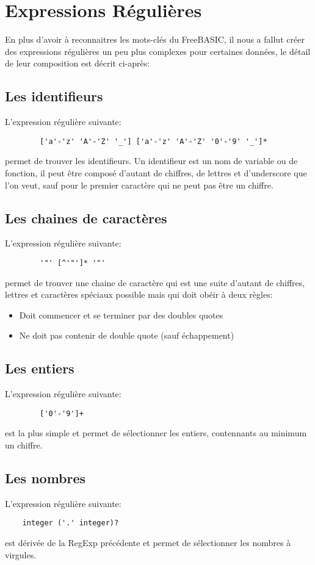 \section{Expressions Régulières}


En plus d'avoir à reconnaitres les mots-clés du FreeBASIC, il nous a fallut créer des expressions régulières un peu plus complexes pour certaines données, le détail de leur composition est décrit ci-après:

\subsection{Les identifieurs} 
    L'expression régulière suivante:
    \begin{verbatim}
        ['a'-'z' 'A'-'Z' '_'] ['a'-'z' 'A'-'Z' '0'-'9' '_']*
    \end{verbatim}
    permet de trouver les identifieurs. Un identifieur est un nom de variable ou de fonction, il peut être composé d'autant de chiffres, de lettres et d'underscore que l'on veut, sauf pour le premier caractère qui ne peut pas être un chiffre.
    
\subsection{Les chaines de caractères}
    L'expression régulière suivante:
    \begin{verbatim}
        '"' [^'"']* '"'
    \end{verbatim}
        permet de trouver une chaine de caractère qui est une suite d'autant de chiffres, lettres et caractères spéciaux possible mais qui doit obéir à deux règles:
    \begin{itemize}
    \item Doit commencer et se terminer par des doubles quotes
    \item Ne doit pas contenir de double quote (sauf échappement)
    \end{itemize}
    
\subsection{Les entiers}
    L'expression régulière suivante:
    \begin{verbatim}
        ['0'-'9']+
    \end{verbatim}
    est la plus simple et permet de sélectionner les entiers, contennants au minimum un chiffre.
    
\subsection{Les nombres}
L'expression régulière suivante:
\begin{verbatim}
    integer ('.' integer)?
\end{verbatim}
    est dérivée de la RegExp précédente et permet de sélectionner les nombres à virgules.
    
